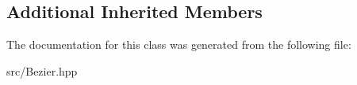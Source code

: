 \subsection*{Additional Inherited Members}


The documentation for this class was generated from the following file\+:\begin{DoxyCompactItemize}
\item 
src/Bezier.\+hpp\end{DoxyCompactItemize}
